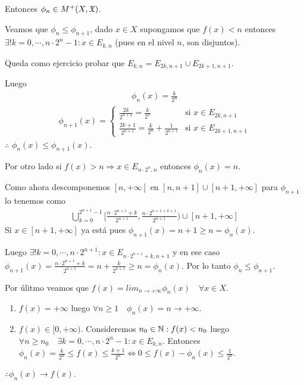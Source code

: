 Entonces \(\phi_n \in M^+(X ,\mathfrak{X})\).

Veamos que \(\phi_n \leq \phi_{n+1}\), dado \(x \in X\) supongamos que \(f(x) < n\) entonces \(\exists! k = 0, \cdots, n \cdot 2^n - 1 : x \in E_{k, n}\) (pues en el nivel \(n\), son disjuntos).

Queda como ejercicio probar que \(E_{k, n} = E_{2k, n+1} \cup E_{2k+1, n+1}\).

Luego
\begin{align*}
    \phi_n(x) = \frac{k}{2^n}
\end{align*}
\begin{align*}\phi_{n+1}(x) = \begin{cases}
                        \frac{2k}{2^{n+1}} = \frac{k}{2^n}                       & \text{si } x \in E_{2k, n+1}   \\
                        \frac{2k+1}{2^{n+1}} = \frac{k}{2^n} + \frac{1}{2^{n+1}} & \text{si } x \in E_{2k+1, n+1}
                    \end{cases}
\end{align*} \(\therefore\) \(\phi_n(x) \leq \phi_{n+1}(x)\).

Por otro lado si \(f(x) > n \Rightarrow x \in E_{n \cdot 2^n, n}\) entonces \(\phi_n(x) = n\).

Como ahora descomponemos \([n, +\infty]\) en \([n, n+1] \cup [n+1, +\infty]\) para \(\phi_{n+1}\) lo tenemos como \begin{align*}
    \bigcup_{k = 0}^{2^{n+1}-1} [ \frac{n \cdot 2^{n+1} + k}{2^{n+1}}, \frac{n \cdot 2^{n+1 + k+1}}{2^{n+1}} ) \cup [n+1, +\infty]
\end{align*}
Si \(x \in [n+1, +\infty]\) ya está pues \(\phi_{n+1}(x) = n+1 \geq n = \phi_n(x)\).

Luego \(\exists ! k = 0, \cdots, n \cdot 2^{n+1} : x \in E_{n \cdot 2^{n+1}+k, n+1}\) y en ese caso
\(\phi_{n+1}(x) = \frac{n \cdot 2^{n+1} + k}{2^{n+1}} = n + \frac{k}{2^{n+1}} \geq n = \phi_n(x)\).
Por lo tanto \(\phi_n \leq \phi_{n+1}\).

Por úlitmo veamos que \(f(x) = lim_{n \to +\infty} \phi_n(x) \quad \forall x \in X\).
\begin{enumerate}
    \item \(f(x) = +\infty\) luego \(\forall n \geq 1 \quad \phi_n(x) = n \to +\infty\).
    \item \(f(x) \in [0, +\infty)\). Consideremos \(n_0 \in \mathbb{N} : f(x) < n_0\) luego \(\forall n \geq n_0 \quad \exists k = 0, \cdots, n \cdot 2^n - 1 : x \in E_{k, n}\).
          Entonces \(\phi_n(x) = \frac{k}{2^n} \leq f(x) \leq \frac{k+1}{2^n} \iff 0 \leq f(x) - \phi_n(x) \leq \frac{1}{2^n}\).
\end{enumerate}
\(\therefore \phi_n(x) \to f(x)\).

